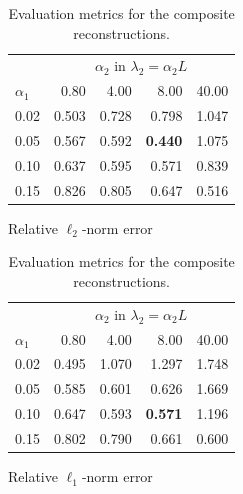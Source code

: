         \begin{table}[b]
        \centering
        \begin{subtable}[t]{0.45\linewidth}
            \centering
            \begin{tabular}{l|rrrr}
                \toprule
                 & \multicolumn{4}{c}{$\alpha_2$ in $\lambda_2 = \alpha_2 L$} \\
                \cmidrule(lr){2-5}
                $\alpha_1$ & 0.80 & 4.00 & 8.00 & 40.00 \\
                \midrule
                0.02 & 0.503 & 0.728 & 0.798 & 1.047 \\
                0.05 & 0.567 & 0.592 & \textbf{0.440} & 1.075 \\
                0.10 & 0.637 & 0.595 & 0.571 & 0.839 \\
                0.15 & 0.826 & 0.805 & 0.647 & 0.516 \\
                \bottomrule
            \end{tabular}
            \caption{Relative $\ell_2$-norm error \label{tab:rl2}}
        \end{subtable}
        \hfill
        \begin{subtable}[t]{0.45\linewidth}
            \centering
            \begin{tabular}{l|rrrr}
                \toprule
                 & \multicolumn{4}{c}{$\alpha_2$ in $\lambda_2 = \alpha_2 L$} \\
                \cmidrule(lr){2-5}
                $\alpha_1$ & 0.80 & 4.00 & 8.00 & 40.00 \\
                \midrule
                0.02 & 0.495 & 1.070 & 1.297 & 1.748 \\
                0.05 & 0.585 & 0.601 & 0.626 & 1.669 \\
                0.10 & 0.647 & 0.593 & \textbf{0.571} & 1.196 \\
                0.15 & 0.802 & 0.790 & 0.661 & 0.600 \\
                \bottomrule
            \end{tabular}
            \caption{Relative $\ell_1$-norm error\label{tab:rl1}}
        \end{subtable}
        \caption{Evaluation metrics for the composite reconstructions.}
        \end{table}
    

